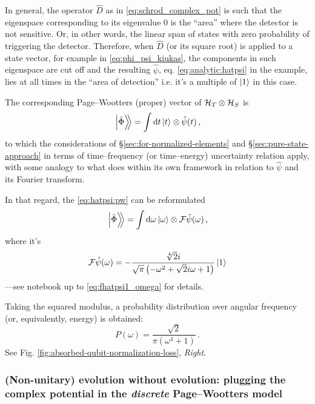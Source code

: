 In general, the operator $\hat{D}$ as in \eqref{eq:schrod_complex_pot}
is such that the eigenspace corresponding to its eigenvalue $0$
is the ``area'' where the detector is not sensitive. Or, in other words,
the linear span of states with zero probability of triggering the detector.
Therefore, when $\hat{D}$ (or its square root) is applied to a state vector,
for example in \eqref{eq:phi_psi_kiukas},
the components in such eigenspace are cut off and the resulting
$\hat{\psi}$, eq. \eqref{eq:analytic:hatpsi} in the example, lies at all times in the ``area of detection''
i.e. it's a multiple of $\ket{1}$ in this case.

The corresponding Page--Wootters (proper) vector of $\mathcal{H}_T \otimes \mathcal{H}_S$ is
\begin{equation}\label{eq:hatpsi:pw}
  \left.\left| \hat{\Phi} \right\rangle\hspace{-0.300em}\right\rangle = \int \dd{t} \ket{t} \otimes \hat{\psi}(t) \,\text{,}
\end{equation}
to which the considerations of \S\ref{sec:for-normalized-elements}
and \S\ref{sec:pure-state-approach} in terms of time--frequency
(or time--energy) uncertainty relation apply, with some analogy
to what \cite{RuschhauptAbsorption} does within its own framework
in relation to $\hat{\psi}$ and its Fourier transform.

In that regard, the \eqref{eq:hatpsi:pw} can be reformulated
\begin{equation}
  \left.\left| \hat{\Phi} \right\rangle\hspace{-0.300em}\right\rangle = \int \dd{\omega} \ket{\omega} \otimes \mathcal{F} \hat{\psi} (\omega) \,\text{,}
\end{equation}
where it's
\begin{equation}
  \mathcal{F} \hat{\psi} (\omega) = - \frac{\sqrt[4]{2} i}{\sqrt{\pi} \left(- \omega^{2} + \sqrt{2} i \omega + 1\right)} \ket{1}
\end{equation}
---see notebook up to \eqref{eq:fhatpsi1_omega} for details.

Taking the squared modulus, a probability distribution over angular frequency
(or, equivalently, energy) is obtained:
\[
  P(\omega) = \frac{\sqrt{2}}{\pi \left(\omega^{4} + 1\right)}
  \,\text{.}
\]
See Fig. \ref{fig:absorbed-qubit-normalization-loss}, \emph{Right}.

\subsubsection{
  (Non-unitary) evolution without evolution:
  plugging the complex potential in the \emph{discrete} Page--Wootters model
}

